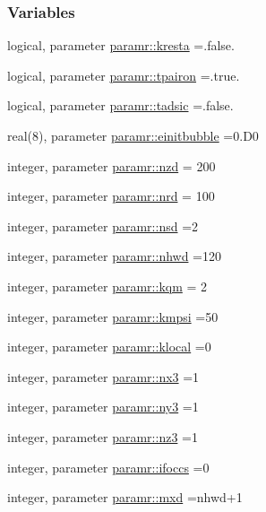 \subsubsection*{Variables}
\begin{DoxyCompactItemize}
\item 
logical, parameter \hyperlink{namespaceparamr_a673c357a29cfbdb53822605a24b3ab51}{paramr\+::kresta} =.false.
\item 
logical, parameter \hyperlink{namespaceparamr_acd8a21779b3d29dfe3626fe843905246}{paramr\+::tpairon} =.true.
\item 
logical, parameter \hyperlink{namespaceparamr_af3cdaaabc4241e21b1befbb1ca885452}{paramr\+::tadsic} =.false.
\item 
real(8), parameter \hyperlink{namespaceparamr_a0c843211548f6ed84cee87900828e1bd}{paramr\+::einitbubble} =0.\+D0
\item 
integer, parameter \hyperlink{namespaceparamr_aadc71badb7f729eaddb68ef0f99b135a}{paramr\+::nzd} = 200
\item 
integer, parameter \hyperlink{namespaceparamr_a61e145b7c61984697a9be78aa8905d94}{paramr\+::nrd} = 100
\item 
integer, parameter \hyperlink{namespaceparamr_a4ff6f5c4777134383ea2daf9fa8709ff}{paramr\+::nsd} =2
\item 
integer, parameter \hyperlink{namespaceparamr_a85e42468af30077429194d0dac1b9081}{paramr\+::nhwd} =120
\item 
integer, parameter \hyperlink{namespaceparamr_af7be40bfd8856e8845a2587d4443e56b}{paramr\+::kqm} = 2
\item 
integer, parameter \hyperlink{namespaceparamr_a65de7b11ee5606af6be31579043dddbc}{paramr\+::kmpsi} =50
\item 
integer, parameter \hyperlink{namespaceparamr_ae7c591a6ca8ece03b8a7ca95857f180f}{paramr\+::klocal} =0
\item 
integer, parameter \hyperlink{namespaceparamr_a1f6d5f50edd0cdf8afaf6ea7e87db420}{paramr\+::nx3} =1
\item 
integer, parameter \hyperlink{namespaceparamr_a245f99c088c6d567bfea27dcd9217928}{paramr\+::ny3} =1
\item 
integer, parameter \hyperlink{namespaceparamr_a024bce0c675160a27120f8bc6effe098}{paramr\+::nz3} =1
\item 
integer, parameter \hyperlink{namespaceparamr_a198d0a4ec3820faf393944e71c1afc24}{paramr\+::ifoccs} =0
\item 
integer, parameter \hyperlink{namespaceparamr_ae5d95bb2efa5483f6b31595801daa446}{paramr\+::mxd} =nhwd+1

\end{DoxyCompactItemize}
